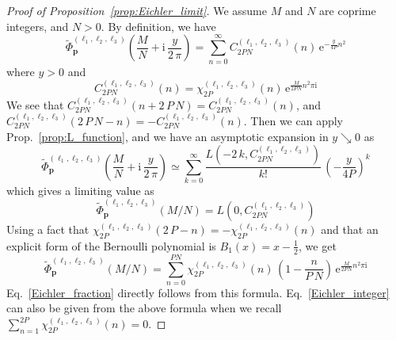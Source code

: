 \documentclass[12pt,reqno]{amsart}
\numberwithin{equation}{section}
\begin{document}
\begin{proof}[Proof of Proposition~\ref{prop:Eichler_limit}]
  We assume $M$ and $N$ are coprime integers, and $N>0$.
  By definition, we have
  \begin{equation*}
    \widetilde{\Phi}_{\boldsymbol{p}}^{(\ell_1,\ell_2,\ell_3)}
    \left(
    \frac{M}{N} + \mathrm{i} \, \frac{y}{2 \, \pi}
    \right)
    =
    \sum_{n=0}^\infty C_{2 P N}^{(\ell_1,\ell_2,\ell_3)}(n) \,
    \mathrm{e}^{- \frac{y}{4 P} n^2}
  \end{equation*}
  where $y>0$ and
  \begin{equation*}
    C_{2 P N}^{(\ell_1,\ell_2,\ell_3)}(n) 
    =
    \chi_{2 P}^{(\ell_1,\ell_2,\ell_3)}(n) \,
    \mathrm{e}^{\frac{M}{2 P N} n^2 \pi \mathrm{i}}
  \end{equation*}
  We see that
  $ C_{2 P N}^{(\ell_1,\ell_2,\ell_3)}(n+2 \, P \, N) 
  =  C_{2 P N}^{(\ell_1,\ell_2,\ell_3)}(n) $,
  and
  $ C_{2 P N}^{(\ell_1,\ell_2,\ell_3)}(2 \, P \, N -n) 
  = - C_{2 P N}^{(\ell_1,\ell_2,\ell_3)}(n) $.
  Then we can apply Prop.~\ref{prop:L_function}, and
  we have an asymptotic expansion in $y\searrow 0$ as
  \begin{equation*}
    \widetilde{\Phi}_{\boldsymbol{p}}^{(\ell_1,\ell_2,\ell_3)}
    \left(
    \frac{M}{N} + \mathrm{i} \, \frac{y}{2 \, \pi}
    \right)
    \simeq
    \sum_{k=0}^\infty
    \frac{L(-2 \, k , C_{2 P N}^{(\ell_1,\ell_2,\ell_3)})}{k!} \,
    \left(
      - \frac{y}{4 P}
    \right)^k
  \end{equation*}
  which gives a limiting value as
  \begin{equation}
    \label{Eichler_and_L}
    \widetilde{\Phi}_{\boldsymbol{p}}^{(\ell_1,\ell_2,\ell_3)}
    (M/N)
    =
    L(0 , C_{2 P N}^{(\ell_1,\ell_2,\ell_3)})
  \end{equation}
  Using a fact that 
  $\chi_{2P}^{(\ell_1,\ell_2,\ell_3)}(2 \, P - n)
  =
  -  \chi_{2P}^{(\ell_1,\ell_2,\ell_3)}(n)$
  and that
  an explicit form of the Bernoulli polynomial is
  $B_1(x)=x-\frac{1}{2}$,
  we get
  \begin{equation*}
    \widetilde{\Phi}_{\boldsymbol{p}}^{(\ell_1,\ell_2,\ell_3)}
    (M/N)
    =
    \sum_{n=0}^{P N}
    \chi_{2 P}^{(\ell_1,\ell_2,\ell_3)}(n) \,
    \left(
      1- \frac{n}{P \, N}
    \right) \,
    \mathrm{e}^{
      \frac{M}{2 P N} n^2 \pi \mathrm{i}
    }
  \end{equation*}
  Eq.~\eqref{Eichler_fraction} directly follows from this formula.
  Eq.~\eqref{Eichler_integer} can also be given from the above formula when we recall
  $\sum_{n=1}^{2 P}       \chi_{2 P}^{(\ell_1 , \ell_2, \ell_3)}(n) 
  =0$.
\end{proof}
\end{document}

